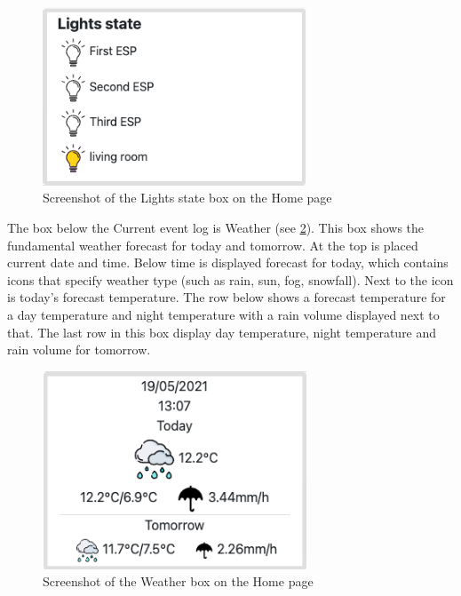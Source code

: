 \begin{figure}[H]
    \centering
    \includegraphics[width=0.7\textwidth]{img/screenshot_home_lights_state.png}
    \caption{Screenshot of the Lights state box on the Home page}
    \label{fig:screenshot_home_lights_state}
\end{figure}

The box below the Current event log is Weather (see \cref{fig:screenshot_home_weather}). This box shows the fundamental weather forecast for today and tomorrow. At the top is placed current date and time. Below time is displayed forecast for today, which contains icons that specify weather type (such as rain, sun, fog, snowfall). Next to the icon is today's forecast temperature. The row below shows a forecast temperature for a day temperature and night temperature with a rain volume displayed next to that. The last row in this box display day temperature, night temperature and rain volume for tomorrow.

\begin{figure}[H]
    \centering
    \includegraphics[width=0.7\textwidth]{img/screenshot_home_weather.png}
    \caption{Screenshot of the Weather box on the Home page}
    \label{fig:screenshot_home_weather}
\end{figure}

